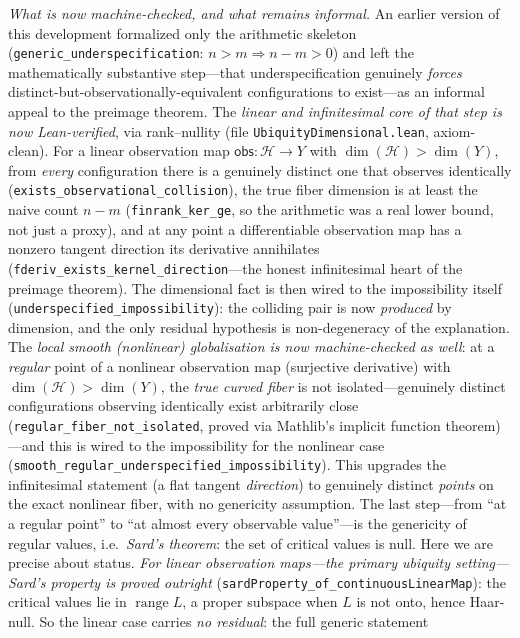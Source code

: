 \documentclass[11pt,a4paper]{article}
\newcommand{\sH}{\mathcal{H}}
\begin{document}
\noindent
\emph{What is now machine-checked, and what remains informal.}  An earlier version of this
development formalized only the arithmetic skeleton (\texttt{generic\_underspecification}: $n > m
\Rightarrow n - m > 0$) and left the mathematically substantive step---that underspecification
genuinely \emph{forces} distinct-but-observationally-equivalent configurations to exist---as an
informal appeal to the preimage theorem.  The \emph{linear and infinitesimal core of that step is now
Lean-verified}, via rank--nullity (file \texttt{UbiquityDimensional.lean}, axiom-clean).  For a linear
observation map $\mathsf{obs} : \sH \to Y$ with $\dim(\sH) > \dim(Y)$, from \emph{every} configuration
there is a genuinely distinct one that observes identically
(\texttt{exists\_observational\_collision}), the true fiber dimension is at least the naive count
$n - m$ (\texttt{finrank\_ker\_ge}, so the arithmetic was a real lower bound, not just a proxy), and at
any point a differentiable observation map has a nonzero tangent direction its derivative annihilates
(\texttt{fderiv\_exists\_kernel\_direction}---the honest infinitesimal heart of the preimage theorem).
The dimensional fact is then wired to the impossibility itself
(\texttt{underspecified\_impossibility}): the colliding pair is now \emph{produced} by dimension, and
the only residual hypothesis is non-degeneracy of the explanation.
The \emph{local smooth (nonlinear) globalisation is now machine-checked as well}: at a \emph{regular}
point of a nonlinear observation map (surjective derivative) with $\dim(\sH) > \dim(Y)$, the \emph{true
curved fiber} is not isolated---genuinely distinct configurations observing identically exist
arbitrarily close (\texttt{regular\_fiber\_not\_isolated}, proved via Mathlib's implicit function
theorem)---and this is wired to the impossibility for the nonlinear case
(\texttt{smooth\_regular\_underspecified\_impossibility}).  This upgrades the infinitesimal statement (a
flat tangent \emph{direction}) to genuinely distinct \emph{points} on the exact nonlinear fiber, with no
genericity assumption.  The last step---from ``at a regular point'' to ``at almost every observable
value''---is the genericity of regular values, i.e.\ \emph{Sard's theorem}: the set of critical values
is null.  Here we are precise about status.  \emph{For linear observation maps---the primary ubiquity
setting---Sard's property is proved outright} (\texttt{sardProperty\_of\_continuousLinearMap}): the
critical values lie in $\operatorname{range} L$, a proper subspace when $L$ is not onto, hence
Haar-null.  So the linear case carries \emph{no residual}: the full generic statement
\end{document}
